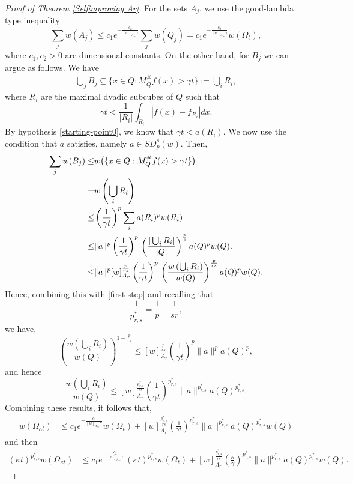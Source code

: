 \documentclass[reqno, 10pt, oneside]{amsart}
\numberwithin{equation}{section}
\numberwithin{theorem}{section}
\newcommand{\1}{{\rm 1\hspace*{-0.4ex}%
\rule{0.1ex}{1.52ex}\hspace*{0.2ex}}}
\begin{document}
\begin{proof}[Proof of Theorem \ref{Selfimproving Ar}]
For the sets $A_j$, we use the good-lambda type inequality  \cite[Corollary 1.4]{CP}.
\begin{equation*}
	\sum_j w(A_j) \leq c_1 e^{-\frac{c_2}{ [w]_{A_{\infty}} \gamma} } \sum_j w(Q_j) = c_1 e^{-\frac{c_2}{ [w]_{A_{\infty}} \gamma} } w(\Omega_t),
\end{equation*}
where $c_1,c_2>0$ are dimensional constants. On the other hand, for $B_j$ we can argue as follows. We have
\begin{align*}
\bigcup_j B_j \subseteq \{x\in Q: M_{Q}^\# f(x)>\gamma t\}:=\bigcup_i R_i,
\end{align*}
where $R_i$ are the maximal dyadic subcubes of $Q$ such that 
\begin{equation*}
	\gamma t < \frac{1}{|R_i|}\int_{R_i}|f(x)-f_{R_i}|dx .
\end{equation*}
By hypothesis \eqref{starting-point0}, we know that $\gamma t < a(R_i)$. We now use the condition that $a$ satisfies, namely $a\in SD_{p}^{s}(w)$. Then,
%
\begin{align}
	\sum_j w(B_j)  \leq & w\big( \{x\in Q: M_{Q}^\# f(x)>\gamma t\} \big) \nonumber\\
    = & w\left(\bigcup_i R_i\right) {\label{first step}}\\
	 \le & \left( \frac{1}{\gamma t}\right)^p\sum_i a(R_i)^p w(R_i) \nonumber \\
	 \le & \|a\|^p \left( \frac{1}{\gamma t}\right)^p \, \left(\frac{|\bigcup_iR_i|}{|Q|} \right )^{ \frac{p}{s} } a(Q)^p w(Q). {\label{middle step}} \\
\le & \|a\|^{p}[w]_{A_r}^{\frac{p}{rs}}\left( \frac{1}{\gamma t}\right)^p \, \left(\frac{w\left(\bigcup_iR_i\right)}{w(Q)} \right )^{\frac{p}{r s} } a(Q)^p w(Q). \nonumber
\end{align}
%
Hence, combining this with \eqref{first step} and recalling that
%
$$
\frac{1}{p_{r,s}^{*}}= \frac{1}{p}- \frac{1}{sr}, 
$$
%
we have,
\begin{equation*}
	\left(\frac{w(\bigcup_iR_i)}{w(Q)} \right)^{1-\frac{p}{rs}} \le [w]_{A_r}^{\frac{p}{rs}} \left( \frac{1}{\gamma t}\right)^{p}\|a\|^{p}a(Q)^{p},
\end{equation*}
and hence
\begin{equation*}
	\frac{w(\bigcup_iR_i)}{w(Q)} \le [w]_{A_r}^{\frac{p_{r,s}^{*}}{rs}} \left( \frac{1}{\gamma t}\right)^{p_{r,s}^{*}}\|a\|^{p_{r,s}^{*}}a(Q)^{p_{r,s}^{*}}.
\end{equation*}
Combining these results, it follows that,  
\begin{align*}
  w(\Omega_{\kappa t}) & \leq c_1 e^{-\frac{c_2}{ [w]_{A_{\infty}}\gamma } }w(\Omega_t) + 
[w]_{A_r}^{\frac{p_{r,s}^{*}}{rs}} \left( \frac{1}{\gamma t }\right)^{p_{r,s}^{*}} \|a\|^{p_{r,s}^{*}}a(Q)^{p_{r,s}^{*}} w(Q)
\end{align*}
and then 
\begin{align*}
(\kappa t)^{p_{r,s}^{*}} w(\Omega_{\kappa t}) & \leq c_1 e^{-\frac{c_2}{ [w]_{A_{\infty}}\gamma } }\, (\kappa t)^{p_{r,s}^{*}}w(\Omega_t) + 
[w]_{A_r}^{\frac{p_{r,s}^{*}}{rs}} \left( \frac{\kappa}{\gamma  }\right)^{p_{r,s}^{*}} \|a\|^{p_{r,s}^{*}}a(Q)^{p_{r,s}^{*}} w(Q).
\end{align*}


\end{proof}
\end{document}
